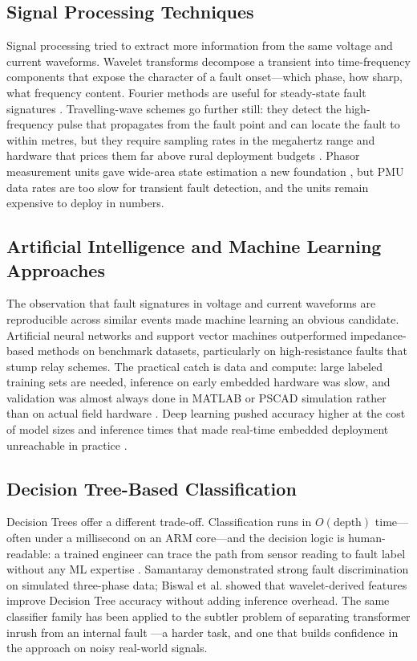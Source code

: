 \documentclass[journal]{IEEEtran}
\begin{document}
\subsection{Signal Processing Techniques}
Signal processing tried to extract more information from the same voltage and current waveforms. Wavelet transforms decompose a transient into time-frequency components that expose the character of a fault onset---which phase, how sharp, what frequency content. Fourier methods are useful for steady-state fault signatures \cite{ref14}. Travelling-wave schemes go further still: they detect the high-frequency pulse that propagates from the fault point and can locate the fault to within metres, but they require sampling rates in the megahertz range and hardware that prices them far above rural deployment budgets \cite{ref5}. Phasor measurement units gave wide-area state estimation a new foundation \cite{ref17,ref21,ref22}, but PMU data rates are too slow for transient fault detection, and the units remain expensive to deploy in numbers.

\subsection{Artificial Intelligence and Machine Learning Approaches}
The observation that fault signatures in voltage and current waveforms are reproducible across similar events made machine learning an obvious candidate. Artificial neural networks \cite{ref18} and support vector machines \cite{ref6,ref8,ref12} outperformed impedance-based methods on benchmark datasets, particularly on high-resistance faults that stump relay schemes. The practical catch is data and compute: large labeled training sets are needed, inference on early embedded hardware was slow, and validation was almost always done in MATLAB or PSCAD simulation rather than on actual field hardware \cite{ref11}. Deep learning pushed accuracy higher at the cost of model sizes and inference times that made real-time embedded deployment unreachable in practice \cite{ref13,ref15}.

\subsection{Decision Tree-Based Classification}
Decision Trees offer a different trade-off. Classification runs in $O(\text{depth})$ time---often under a millisecond on an ARM core---and the decision logic is human-readable: a trained engineer can trace the path from sensor reading to fault label without any ML expertise \cite{ref20}. Samantaray \cite{ref7} demonstrated strong fault discrimination on simulated three-phase data; Biswal et al. \cite{ref9} showed that wavelet-derived features improve Decision Tree accuracy without adding inference overhead. The same classifier family has been applied to the subtler problem of separating transformer inrush from an internal fault \cite{ref10}---a harder task, and one that builds confidence in the approach on noisy real-world signals.
\end{document}

